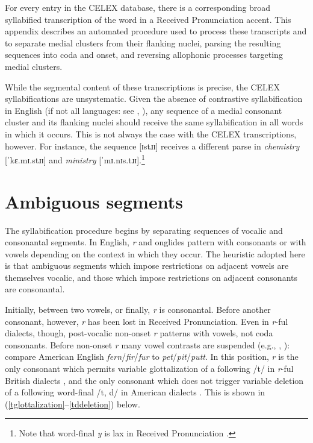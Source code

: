 \label{syllabification}

For every entry in the CELEX database, there is a corresponding broad syllabified transcription of the word in a Received Pronunciation accent. This appendix describes an automated procedure used to process these transcripts and to separate medial clusters from their flanking nuclei, parsing the resulting sequences into coda and onset, and reversing allophonic processes targeting medial clusters.

While the segmental content of these transcriptions is precise, the CELEX syllabifications are unsystematic. Given the absence of contrastive syllabification in English (if not all languages: see \citealp[221]{Blevins1995}, \citealp{Elfner2006}), any sequence of a medial consonant cluster and its flanking nuclei should receive the same syllabification in all words in which it occurs. This is not always the case with the CELEX transcriptions, however. For instance, the sequence [ɪstɹɪ] receives a different parse in \emph{chemistry} [ˈkɛ.mɪ.stɹɪ] and \emph{ministry} [ˈmɪ.nɪs.tɹɪ].\footnote{Note that word-final \emph{y} is lax in Received Pronunciation \citep[][II.294]{AOE}.}

\section{Ambiguous segments}

The syllabification procedure begins by separating sequences of vocalic and consonantal segments. In English, \emph{r} and onglides pattern with consonants or with vowels depending on the context in which they occur. The heuristic adopted here is that ambiguous segments which impose restrictions on adjacent vowels are themselves vocalic, and those which impose restrictions on adjacent consonants are consonantal.

Initially, between two vowels, or finally, \emph{r} is consonantal. Before another consonant, however, \emph{r} has been lost in Received Pronunciation. Even in \emph{r}-ful dialects, though, post-vocalic non-onset \emph{r} patterns with vowels, not coda consonants. Before non-onset \emph{r} many vowel contrasts are suspended (e.g., \citealp[269f.]{Fudge1969}, \citealp[][255]{Harris1994}): compare American English \emph{fern}/\emph{fir}/\emph{fur} to \emph{pet}/\emph{pit}/\emph{putt}. In this position, \emph{r} is the only consonant which permits variable glottalization of a following /t/ in \emph{r}-ful British dialects \citep[258]{Harris1994}, and the only consonant which does not trigger variable deletion of a following word-final /t, d/ in American dialects \citep[8]{Guy1980}. This is shown in (\ref{tglottalization}--\ref{tddeletion}) below.

